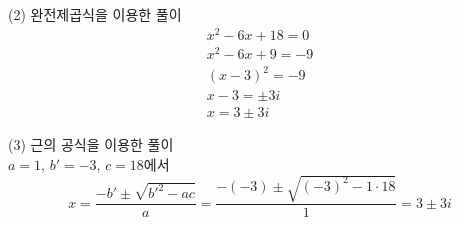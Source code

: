 \documentclass{oblivoir}
\begin{document}
%
\begin{mdframed}[skipabove=-30pt]
(2) 완전제곱식을 이용한 풀이
\begin{gather*}
x^2-6x+18=0\\
x^2-6x+9=-9\\
(x-3)^2=-9\\
x-3=\pm3i\\
x=3\pm3i
\end{gather*}
\end{mdframed}

\begin{mdframed}
(3) 근의 공식을 이용한 풀이\\
\(a=1\), \(b'=-3\), \(c=18\)에서
\[x=\frac{-b'\pm\sqrt{b'^2-ac}}{a}=\frac{-(-3)\pm\sqrt{(-3)^2-1\cdot18}}{1}
=3\pm3i\]
\end{mdframed}
\end{document}
